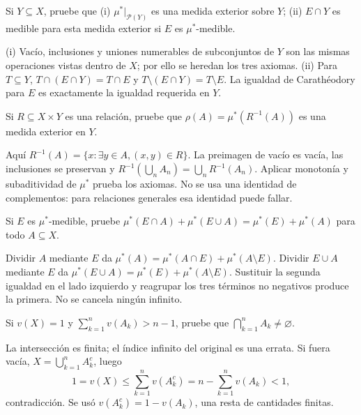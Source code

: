 \begin{ejercicio}\label{ej:v2-l04-3}
Si $Y\subseteq X$, pruebe que (i) $\mu^*|_{\mathcal P(Y)}$ es una medida exterior sobre $Y$; (ii) $E\cap Y$ es medible para esta medida exterior si $E$ es $\mu^*$-medible.
\end{ejercicio}
\begin{solucion}
(i) Vacío, inclusiones y uniones numerables de subconjuntos de $Y$ son las mismas operaciones vistas dentro de $X$; por ello se heredan los tres axiomas. (ii) Para $T\subseteq Y$, $T\cap(E\cap Y)=T\cap E$ y $T\setminus(E\cap Y)=T\setminus E$. La igualdad de Carathéodory para $E$ es exactamente la igualdad requerida en $Y$.
\end{solucion}

\begin{ejercicio}\label{ej:v2-l04-4}
Si $R\subseteq X\times Y$ es una relación, pruebe que $\rho(A)=\mu^*(R^{-1}(A))$ es una medida exterior en $Y$.
\end{ejercicio}
\begin{solucion}
Aquí $R^{-1}(A)=\{x:\exists y\in A, (x,y)\in R\}$. La preimagen de vacío es vacía, las inclusiones se preservan y $R^{-1}(\bigcup_nA_n)=\bigcup_nR^{-1}(A_n)$. Aplicar monotonía y subaditividad de $\mu^*$ prueba los axiomas. No se usa una identidad de complementos: para relaciones generales esa identidad puede fallar.
\end{solucion}

\begin{ejercicio}\label{ej:v2-l04-5}
Si $E$ es $\mu^*$-medible, pruebe $\mu^*(E\cap A)+\mu^*(E\cup A)=\mu^*(E)+\mu^*(A)$ para todo $A\subseteq X$.
\end{ejercicio}
\begin{solucion}
Dividir $A$ mediante $E$ da $\mu^*(A)=\mu^*(A\cap E)+\mu^*(A\setminus E)$. Dividir $E\cup A$ mediante $E$ da $\mu^*(E\cup A)=\mu^*(E)+\mu^*(A\setminus E)$. Sustituir la segunda igualdad en el lado izquierdo y reagrupar los tres términos no negativos produce la primera. No se cancela ningún infinito.
\end{solucion}

\begin{ejercicio}\label{ej:v2-l05-1}
Si $v(X)=1$ y $\sum_{k=1}^nv(A_k)>n-1$, pruebe que $\bigcap_{k=1}^nA_k\ne\varnothing$.
\end{ejercicio}
\begin{solucion}
La intersección es finita; el índice infinito del original es una errata. Si fuera vacía, $X=\bigcup_{k=1}^nA_k^c$, luego
\[1=v(X)\le\sum_{k=1}^nv(A_k^c)=n-\sum_{k=1}^nv(A_k)<1,\]
contradicción. Se usó $v(A_k^c)=1-v(A_k)$, una resta de cantidades finitas.
\end{solucion}

